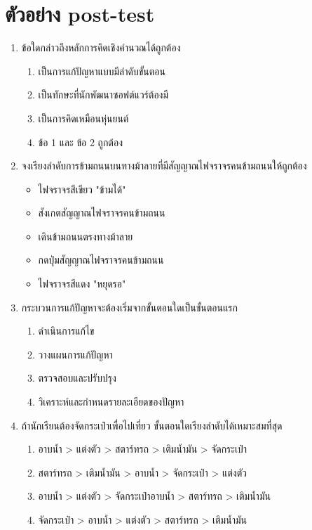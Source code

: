 \section{ตัวอย่าง post-test}
\begin{enumerate}
    \item ข้อใดกล่าวถึงหลักการคิดเชิงคำนวณได้ถูกต้อง
    \begin{enumerate}
        \item เป็นการแก้ปัญหาแบบมีลำดับขั้นตอน
        \item เป็นทักษะที่นักพัฒนาซอฟต์แวร์ต้องมี
        \item เป็นการคิดเหมือนหุ่นยนต์
        \item ข้อ 1 และ ข้อ 2 ถูกต้อง
    \end{enumerate}
    \item จงเรียงลำดับการข้ามถนนบนทางม้าลายที่มีสัญญาณไฟจราจรคนข้ามถนนให้ถูกต้อง
    \begin{itemize}
        \item ไฟจราจรสีเขียว "ข้ามได้"
        \item สังเกตสัญญาณไฟจราจรคนข้ามถนน
        \item เดินข้ามถนนตรงทางม้าลาย
        \item กดปุ่มสัญญาณไฟจราจรคนข้ามถนน
        \item ไฟจราจรสีแดง "หยุดรอ"
    \end{itemize}
    \item กระบวนการแก้ปัญหาจะต้องเริ่มจากขั้นตอนใดเป็นขั้นตอนแรก
    \begin{enumerate}
        \item ดำเนินการแก้ไข
        \item วางแผนการแก้ปัญหา
        \item ตรวจสอบและปรับปรุง
        \item วิเคราะห์และกำหนดรายละเอียดของปัญหา
    \end{enumerate}
    \item ถ้านักเรียนต้องจัดกระเป๋าเพื่อไปเที่ยว ขั้นตอนใดเรียงลำดับได้เหมาะสมที่สุด
    \begin{enumerate}
        \item อาบน้ำ > แต่งตัว > สตาร์ทรถ > เติมน้ำมัน > จัดกระเป๋า
        \item สตาร์ทรถ > เติมน้ำมัน > อาบน้ำ > จัดกระเป๋า > แต่งตัว
        \item อาบน้ำ > แต่งตัว > จัดกระเป๋าอาบน้ำ > สตาร์ทรถ > เติมน้ำมัน
        \item จัดกระเป๋า > อาบน้ำ > แต่งตัว > สตาร์ทรถ > เติมน้ำมัน
    \end{enumerate}

\end{enumerate}
